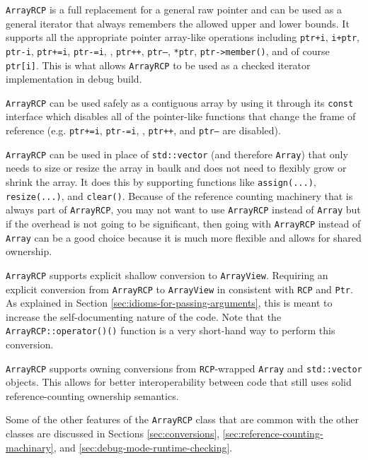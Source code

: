 \documentclass[pdf,ps2pdf,11pt]{SANDreport}
\begin{document}
{}\texttt{ArrayRCP} is a full replacement for a general raw
pointer and can be used as a general iterator that always remembers
the allowed upper and lower bounds.  It supports all the appropriate
pointer array-like operations including {}\texttt{ptr+i},
{}\texttt{i+ptr}, {}\texttt{ptr-i}, {}\texttt{ptr+=i},
{}\texttt{ptr-=i}, , {}\texttt{ptr++}, {}\texttt{ptr--},
{}\texttt{*ptr}, {}\texttt{ptr->member()}, and of course
{}\texttt{ptr[i]}.  This is what allows {}\texttt{ArrayRCP} to be used
as a checked iterator implementation in debug build.

{}\texttt{ArrayRCP} can be used safely as a contiguous array by
using it through its {}\texttt{const} interface which disables all of
the pointer-like functions that change the frame of reference
(e.g. {}\texttt{ptr+=i}, {}\texttt{ptr-=i}, , {}\texttt{ptr++}, and
{}\texttt{ptr--} are disabled).

{}\texttt{ArrayRCP} can be used in place of
{}\texttt{std::vector} (and therefore {}\texttt{Array}) that only
needs to size or resize the array in baulk and does not need to
flexibly grow or shrink the array.  It does this by supporting
functions like {}\texttt{assign(...)}, {}\texttt{resize(...)}, and
{}\texttt{clear()}.  Because of the reference counting machinery that
is always part of {}\texttt{ArrayRCP}, you may not want to use
{}\texttt{ArrayRCP} instead of {}\texttt{Array} but if the overhead is
not going to be significant, then going with {}\texttt{ArrayRCP}
instead of {}\texttt{Array} can be a good choice because it is much
more flexible and allows for shared ownership.

{}\texttt{ArrayRCP} supports explicit shallow conversion to
{}\texttt{ArrayView}.  Requiring an explicit conversion from
{}\texttt{ArrayRCP} to {}\texttt{ArrayView} in consistent with
{}\texttt{RCP} and {}\texttt{Ptr}.  As explained in Section
{}\ref{sec:idioms-for-passing-arguments}, this is meant to increase
the self-documenting nature of the code.  Note that the
{}\texttt{ArrayRCP::operator()()} function is a very short-hand way to
perform this conversion.

{}\texttt{ArrayRCP} supports owning conversions from
{}\texttt{RCP}-wrapped {}\texttt{Array} and {}\texttt{std::vector}
objects.  This allows for better interoperability between code that
still uses solid reference-counting ownership semantics.

Some of the other features of the {}\texttt{ArrayRCP} class that are
common with the other classes are discussed in Sections
{}\ref{sec:conversions}, {}\ref{sec:reference-counting-machinary}, and
{}\ref{sec:debug-mode-runtime-checking}.
\end{document}
